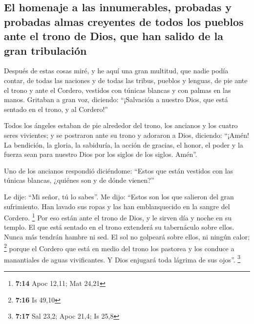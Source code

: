 \begin{paracol}{2}
\hypertarget{el-homenaje-a-las-innumerables-probadas-y-probadas-almas-creyentes-de-todos-los-pueblos-ante-el-trono-de-dios-que-han-salido-de-la-gran-tribulaciuxf3n}{%
\subsection{El homenaje a las innumerables, probadas y probadas almas
creyentes de todos los pueblos ante el trono de Dios, que han salido de
la gran
tribulación}\label{el-homenaje-a-las-innumerables-probadas-y-probadas-almas-creyentes-de-todos-los-pueblos-ante-el-trono-de-dios-que-han-salido-de-la-gran-tribulaciuxf3n}}

 Después de estas cosas miré, y he aquí una gran multitud,
que nadie podía contar, de todas las naciones y de todas las tribus,
pueblos y lenguas, de pie ante el trono y ante el Cordero, vestidos con
túnicas blancas y con palmas en las manos.  Gritaban a
gran voz, diciendo: ``¡Salvación a nuestro Dios, que está sentado en el
trono, y al Cordero!''

 Todos los ángeles estaban de pie alrededor del trono,
los ancianos y los cuatro seres vivientes; y se postraron ante su trono
y adoraron a Dios,  diciendo: ``¡Amén! La bendición, la
gloria, la sabiduría, la acción de gracias, el honor, el poder y la
fuerza sean para nuestro Dios por los siglos de los siglos. Amén''.

 Uno de los ancianos respondió diciéndome: ``Estos que
están vestidos con las túnicas blancas, ¿quiénes son y de dónde
vienen?''

 Le dije: ``Mi señor, tú lo sabes''. Me dijo: ``Estos son
los que salieron del gran sufrimiento. Han lavado sus ropas y las han
emblanquecido en la sangre del Cordero. \footnote{\textbf{7:14} Apoc
  12,11; Mat 24,21}  Por eso están ante el trono de Dios,
y le sirven día y noche en su templo. El que está sentado en el trono
extenderá su tabernáculo sobre ellos.  Nunca más tendrán
hambre ni sed. El sol no golpeará sobre ellos, ni ningún calor;
\footnote{\textbf{7:16} Is 49,10}  porque el Cordero que
está en medio del trono los pastorea y los conduce a manantiales de
aguas vivificantes. Y Dios enjugará toda lágrima de sus ojos''.
\footnote{\textbf{7:17} Sal 23,2; Apoc 21,4; Is 25,8}

\switchcolumn
\begin{otherlanguage}{english}


\end{otherlanguage}
\end{paracol}
